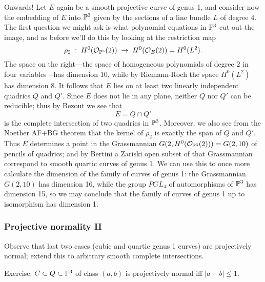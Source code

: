 Onwards! Let $E$ again be a smooth projective curve of genus 1, and consider now the embedding of $E$ into ${\mathbb P}^3$ given by the sections of a line bundle $L$ of degree 4. The first question we might ask is what polynomial equations in ${\mathbb P}^3$ cut out the image, and as before we'll do this by looking at the restriction map
$$
\rho_2 \;  : \; H^0({\mathcal O}_{{\mathbb P}^3}(2)) \; \to \; H^0({\mathcal O}_{E}(2)) = H^0(L^2).
$$
The space on the right---the space of homogeneous polynomials of degree 2 in four variables---has dimension 10, while by Riemann-Roch the space $H^0(L^2)$ has dimension 8. It follows that $E$ lies on at least two linearly independent quadrics $Q$ and $Q'$. Since $E$ does not lie in any plane, neither $Q$ nor $Q'$ can be reducible; thus by Bezout we see that
$$
E = Q \cap Q'
$$
is the complete intersection of two quadrics in ${\mathbb P}^3$. Moreover, we also see from the Noether AF+BG theorem that the kernel of $\rho_2$ is exactly the span of $Q$ and $Q'$. Thus $E$ determines a point in the Grassmannian $G(2, H^0({\mathcal O}_{{\mathbb P}^3}(2))) = G(2, 10)$ of pencils of quadrics; and by Bertini a Zariski open subset of that Grassmannian correspond to smooth quartic curves of genus 1. We can use this to once more calculate the dimension of the family of curves of genus 1: the Grassmannian $G(2,10)$ has dimension 16, while the group $PGL_4$ of automorphisms of ${\mathbb P}^3$ has dimension 15, so we may conclude that the family of curves of genus 1 up to isomorphism has dimension 1.

\subsubsection{Projective normality II}

Observe that last two cases (cubic and quartic genus 1 curves) are projectively normal; extend this to arbitrary smooth complete intersections.

Exercise: $C \subset Q \subset {\mathbb P}^3$ of class $(a,b)$ is projectively normal iff $|a-b| \leq 1$.





